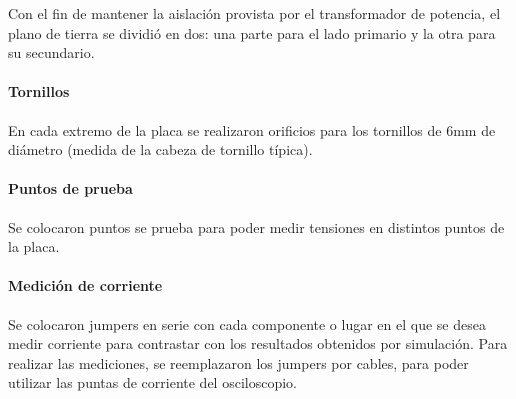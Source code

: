 Con el fin de mantener la aislación provista por el transformador de potencia, 
el plano de tierra se dividió en dos: una parte para el lado primario y la otra para su secundario.

\paragraph{Tornillos}

En cada extremo de la placa se realizaron orificios para los tornillos de 6mm de diámetro (medida de la cabeza de tornillo típica). 

\paragraph{Puntos de prueba}

Se colocaron puntos se prueba para poder medir tensiones en distintos puntos de la placa.

\paragraph{Medición de corriente} 

Se colocaron jumpers en serie con cada componente o lugar
en el que se desea medir corriente para contrastar con los resultados obtenidos por simulación.
Para realizar las mediciones, se reemplazaron los jumpers por cables,
para poder utilizar las puntas de corriente del osciloscopio.